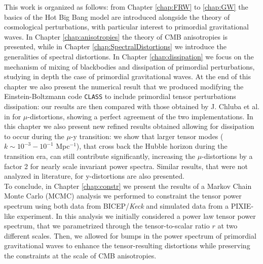 This work is organized as follows: from Chapter \ref{chap:FRW} to \ref{chap:GW} the basics of the Hot Big Bang model are introduced alongside the theory of cosmological perturbations, with particular interest to primordial gravitational waves. In Chapter \ref{chap:anisotropies} the theory of CMB anisotropies is presented, while in Chapter \ref{chap:SpectralDistortions} we introduce the generalities of spectral distortions. In Chapter \ref{chap:dissipation} we focus on the mechanism of mixing of blackbodies and dissipation of primordial perturbations, studying in depth the case of primordial gravitational waves. At the end of this chapter we also present the numerical result that we produced modifying the Einstein-Boltzmann code \texttt{CLASS} \cite{CLASS} to include primordial tensor perturbations dissipation: our results are then compared with those obtained by J. Chluba et al. in \cite{Chluba_tens_diss} for $\mu$-distortions, showing a perfect agreement of the two implementations. In this chapter we also present new refined results obtained allowing for dissipation to occur during the $\mu$-y transition: we show that larger tensor modes ($k\sim 10^{-3}-10^{-1}$ Mpc$^{-1}$), that cross back the Hubble horizon during the transition era, can still contribute significantly, increasing the $\mu$-distortions by a factor 2 for nearly scale invariant power spectra. Similar results, that were not analyzed in literature, for y-distortions are also presented.\\
To conclude, in Chapter \ref{chap:constr} we present the results of a Markov Chain Monte Carlo (MCMC) analysis we performed to constraint the tensor power spectrum using both data from BICEP/\textit{Keck} \cite{Ade_2021} and simulated data from a PIXIE-like experiment. In this analysis we initially considered a power law tensor power spectrum, that we parametrized through the tensor-to-scalar ratio $r$ at two different scales. Then, we allowed for bumps in the power spectrum of primordial gravitational waves to  enhance the tensor-resulting distortions while preserving the constraints at the scale of CMB anisotropies.    